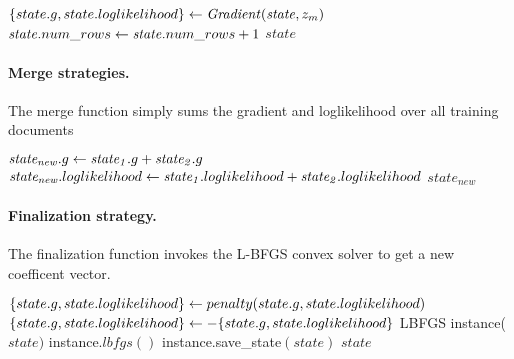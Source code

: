 \begin{algorithm} \label{alg:transition-lbfgs}
\begin{algorithmic}[1]
    \State $\{state.g,state.loglikelihood\}  \leftarrow \mathit{Gradient}(\mathit{state}, z_m)$
    \State $\mathit{state}.num\_rows \leftarrow \mathit{state}.num\_rows + 1$
    \State \Return $\mathit{state}$
\end{algorithmic}
\end{algorithm}


\paragraph{Merge strategies.}
The merge function simply sums the gradient and loglikelihood over all training documents 
\begin{algorithm} \label{alg:merge-lbfgs}
\begin{algorithmic}[1]
    \State $\mathit{state_{new}}.g \leftarrow \mathit{state_1}.g + \mathit{state_2}.g$
    \State $\mathit{state_{new}}.loglikelihood \leftarrow \mathit{state_1}.loglikelihood + \mathit{state_2}.loglikelihood$
    \State \Return $\mathit{state_{new}}$
\end{algorithmic}
\end{algorithm}


\paragraph{Finalization strategy.}
The finalization function invokes the L-BFGS convex solver to get a new coefficent vector.\\

\begin{algorithm} \label{alg:CRF training}
\begin{algorithmic}[1]
        \State $\{state.g,state.loglikelihood\} \leftarrow penalty(state.g,state.loglikelihood)$  
        \State $\{state.g,state.loglikelihood\}\leftarrow-\{state.g,state.loglikelihood\}$ 
        \State LBFGS instance($state)$ 
        \State instance.$lbfgs()$ 
        \State instance.save\_state$(state)$ 
        \State \Return $state$
\end{algorithmic}
\end{algorithm}

